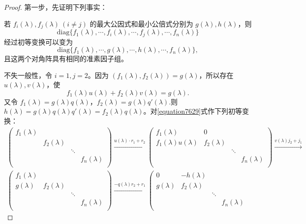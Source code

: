 \documentclass[../../main.tex]{subfiles}%
\begin{document}
\begin{proof}

第一步，先证明下列事实：

若 $f_i(\lambda), f_j(\lambda)\ (i\neq j)$ 的最大公因式和最小公倍式分别为 $g(\lambda), h(\lambda)$，则
\[
\mathrm{diag}\{f_1(\lambda),\cdots,f_i(\lambda),\cdots,f_j(\lambda),\cdots,f_n(\lambda)\}
\]
经过初等变换可以变为
\[
\mathrm{diag}\{f_1(\lambda),\cdots,g(\lambda),\cdots,h(\lambda),\cdots,f_n(\lambda)\},
\]
且这两个对角阵具有相同的准素因子组。

不失一般性，令 $i = 1, j = 2$。因为 $(f_1(\lambda), f_2(\lambda)) = g(\lambda)$，所以存在 $u(\lambda), v(\lambda)$，使
\[
f_1(\lambda)u(\lambda)+f_2(\lambda)v(\lambda)=g(\lambda).
\]
又令 $f_1(\lambda)=g(\lambda)q(\lambda)$，$f_2(\lambda)=g(\lambda)q'(\lambda)$.则 $h(\lambda)=g(\lambda)q(\lambda)q'(\lambda)=f_2(\lambda)q(\lambda)$。对\eqref{equation7629}式作下列初等变换：
\begin{gather*}
\left( \begin{matrix}
f_1(\lambda )&		&		&		\\
&		f_2(\lambda )&		&		\\
&		&		\ddots&		\\
&		&		&		f_n(\lambda )\\
\end{matrix} \right) \xrightarrow{u(\lambda )\cdot r_1+r_2}\left( \begin{matrix}
f_1(\lambda )&		0&		&		\\
f_1(\lambda )u(\lambda )&		f_2(\lambda )&		&		\\
&		&		\ddots&		\\
&		&		&		f_n(\lambda )\\
\end{matrix} \right) \xrightarrow{v(\lambda )j_2+j_1}
\\
\left( \begin{matrix}
f_1(\lambda )&		&		&		\\
g(\lambda )&		f_2(\lambda )&		&		\\
&		&		\ddots&		\\
&		&		&		f_n(\lambda )\\
\end{matrix} \right) \xrightarrow{-q(\lambda )r_2+r_1}\left( \begin{matrix}
0&		-h(\lambda )&		&		\\
g(\lambda )&		f_2(\lambda )&		&		\\
&		&		\ddots&		\\
&		&		&		f_n(\lambda )\\

\end{matrix}
\end{gather*}
\end{proof}
\end{document}
